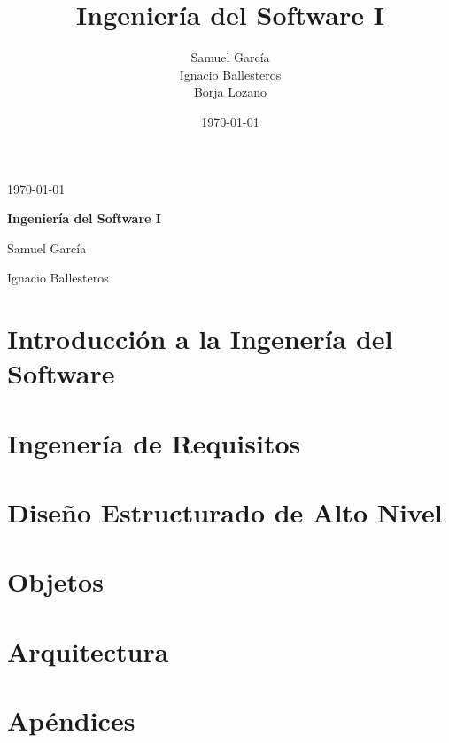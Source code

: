 \documentclass[12pt,a4paper]{report}
\title{Ingeniería del Software I}
\author{Samuel García \\ Ignacio Ballesteros \\ Borja Lozano}
\date{\today}
\begin{document}
\begin{titlepage}
	\hfill \today

	\vspace{.2\textheight}

	\begin{center}
		{\huge\bfseries Ingeniería del Software I\par}
		\vspace{3cm}
		Samuel García \par
		Ignacio Ballesteros \par
	\end{center}

\end{titlepage}\tableofcontents


\chapter{Introducción a la Ingenería del Software}
\label{chap:introduccion}

\chapter{Ingenería de Requisitos}
\label{chap:requisitos}


\chapter{Diseño Estructurado de Alto Nivel}
\label{chap:estructurado}

\chapter{Objetos}
\label{chap:objetos}


\chapter{Arquitectura}
\label{chap:arquitectura}



\chapter{Apéndices}
\end{document}

